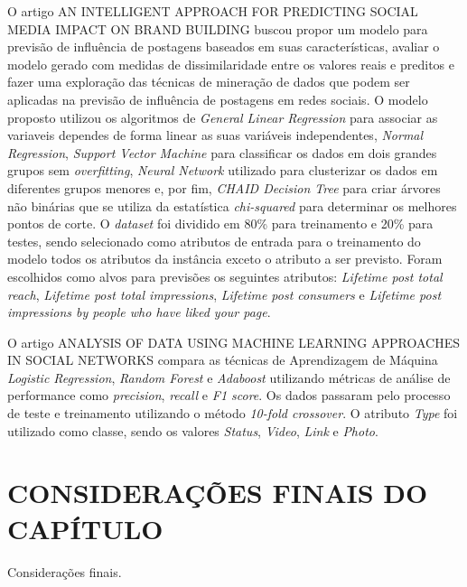 O artigo AN INTELLIGENT APPROACH FOR PREDICTING SOCIAL MEDIA IMPACT ON BRAND BUILDING buscou propor um modelo para previsão de influência de postagens baseados em suas características, avaliar o modelo gerado com medidas de dissimilaridade entre os valores reais e preditos e fazer uma exploração das técnicas de mineração de dados que podem ser aplicadas na previsão de influência de postagens em redes sociais. O modelo proposto utilizou os algoritmos de \textit{General Linear Regression} para associar as variaveis dependes de forma linear as suas variáveis independentes, \textit{Normal Regression}, \textit{Support Vector Machine} para classificar os dados em dois grandes grupos sem \textit{overfitting}, \textit{Neural Network} utilizado para clusterizar os dados em diferentes grupos menores e, por fim, \textit{CHAID Decision Tree} para criar árvores não binárias que se utiliza da estatística \textit{chi-squared} para determinar os melhores pontos de corte. O \textit{dataset} foi dividido em 80\% para treinamento e 20\% para testes, sendo selecionado como atributos de entrada para o treinamento do modelo todos os atributos da instância exceto o atributo a ser previsto. Foram escolhidos como alvos para previsões os seguintes atributos: \textit{Lifetime post total reach}, \textit{Lifetime post total impressions}, \textit{Lifetime post consumers} e \textit{Lifetime post impressions by people who have liked your page}.

O artigo ANALYSIS OF DATA USING MACHINE LEARNING APPROACHES IN SOCIAL NETWORKS compara as técnicas de Aprendizagem de Máquina \textit{Logistic Regression}, \textit{Random Forest} e \textit{Adaboost} utilizando métricas de análise de performance como \textit{precision}, \textit{recall} e \textit{F1 score}. Os dados passaram pelo processo de teste e treinamento utilizando o método \textit{10-fold crossover}. O atributo \textit{Type} foi utilizado como classe, sendo os valores \textit{Status}, \textit{Video}, \textit{Link} e \textit{Photo}.

\section{CONSIDERAÇÕES FINAIS DO CAPÍTULO}
\label{sec:consideracoesFinaisRevisao}
Considerações finais.
